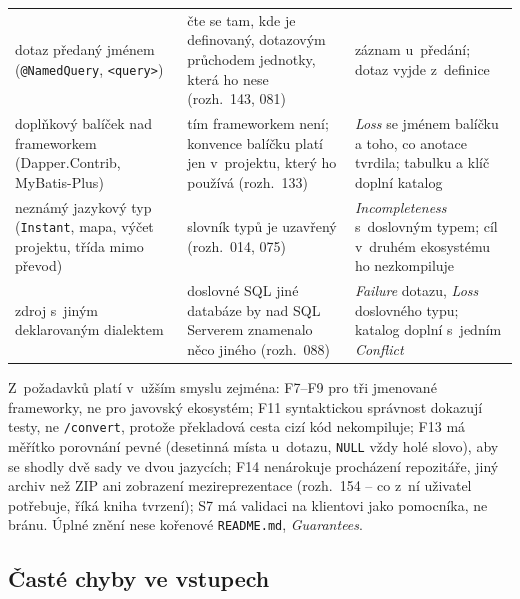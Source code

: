 \documentclass{article}
\begin{document}
{\begin{longtable}{L{3.6cm} L{9.6cm} L{3.2cm}}
dotaz předaný jménem (\texttt{@NamedQuery}, \texttt{<query>}) & čte se tam, kde je definovaný, dotazovým průchodem jednotky, která ho nese (rozh.~143, 081) & záznam u~předání; dotaz vyjde z~definice \\
doplňkový balíček nad frameworkem (Dapper.Contrib, MyBatis-Plus) & tím frameworkem není; konvence balíčku platí jen v~projektu, který ho používá (rozh.~133) & \emph{Loss} se jménem balíčku a toho, co anotace tvrdila; tabulku a klíč doplní katalog \\
neznámý jazykový typ (\texttt{Instant}, mapa, výčet projektu, třída mimo převod) & slovník typů je uzavřený (rozh.~014, 075) & \emph{Incompleteness} s~doslovným typem; cíl v~druhém ekosystému ho nezkompiluje \\
zdroj s~jiným deklarovaným dialektem & doslovné SQL jiné databáze by nad SQL Serverem znamenalo něco jiného (rozh.~088) & \emph{Failure} dotazu, \emph{Loss} doslovného typu; katalog doplní s~jedním \emph{Conflict} \\
\end{longtable}}

Z~požadavků platí v~užším smyslu zejména: F7--F9 pro tři jmenované frameworky, ne pro javovský ekosystém; F11 syntaktickou správnost dokazují testy, ne \texttt{/convert}, protože překladová cesta cizí kód nekompiluje; F13 má měřítko porovnání pevné (desetinná místa u~dotazu, \texttt{NULL} vždy holé slovo), aby se shodly dvě sady ve dvou jazycích; F14 nenárokuje procházení repozitáře, jiný archiv než ZIP ani zobrazení mezireprezentace (rozh.~154 -- co z~ní uživatel potřebuje, říká kniha tvrzení); S7 má validaci na klientovi jako pomocníka, ne bránu. Úplné znění nese kořenové \texttt{README.md}, \emph{Guarantees}.

\subsection{Časté chyby ve vstupech}\label{sec:chyby-vstup}
\end{document}
